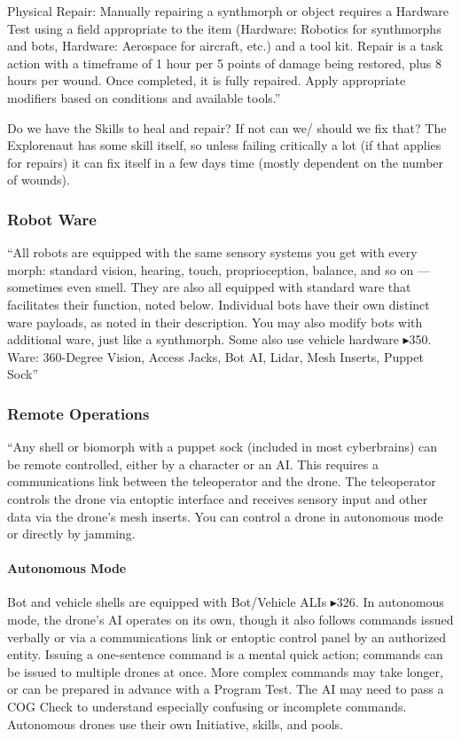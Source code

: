 Physical Repair: Manually repairing a synthmorph or object requires a Hardware Test using a field appropriate to the item (Hardware: Robotics for synthmorphs and bots, Hardware: Aerospace for aircraft, etc.) and a tool kit. Repair is a task action with a timeframe of 1 hour per 5 points of damage being restored, plus 8 hours per wound. Once completed, it is fully repaired. Apply appropriate modifiers based on conditions and available tools.” \citep[pg. 221]{ep2e_1.1_2019}

Do we have the Skills to heal and repair? If not can we/ should we fix that? The Explorenaut has some skill itself, so unless failing critically a lot (if that applies for repairs) it can fix itself in a few days time (mostly dependent on the number of wounds).


\subsubsection{Robot Ware}

“All robots are equipped with the same sensory systems you get with every morph: standard vision, hearing, touch, proprioception, balance, and so on — sometimes even smell. They are also all equipped with standard ware that facilitates their function, noted below. Individual bots have their own distinct ware payloads, as noted in their description. You may also modify bots with additional ware, just like a synthmorph. Some also use vehicle hardware $\blacktriangleright$350. Ware: 360-Degree Vision, Access Jacks, Bot AI, Lidar, Mesh Inserts, Puppet Sock” \citep[pg. 346]{ep2e_1.1_2019}

\subsubsection{Remote Operations}

“Any shell or biomorph with a puppet sock (included in most cyberbrains) can be remote controlled, either by a character or an AI. This requires a communications link between the teleoperator and the drone. The teleoperator controls the drone via entoptic interface and receives sensory input and other data via the drone’s mesh inserts. You can control a drone in autonomous mode or directly by jamming.

\paragraph{Autonomous Mode} Bot and vehicle shells are equipped with Bot/Vehicle ALIs $\blacktriangleright$326. In autonomous mode, the drone’s AI operates on its own, though it also follows commands issued verbally or via a communications link or entoptic control panel by an authorized entity. Issuing a one-sentence command is a mental quick action; commands can be issued to multiple drones at once. More complex commands may take longer, or can be prepared in advance with a Program Test. The AI may need to pass a COG Check to understand especially confusing or incomplete commands. Autonomous drones use their own Initiative, skills, and pools.

